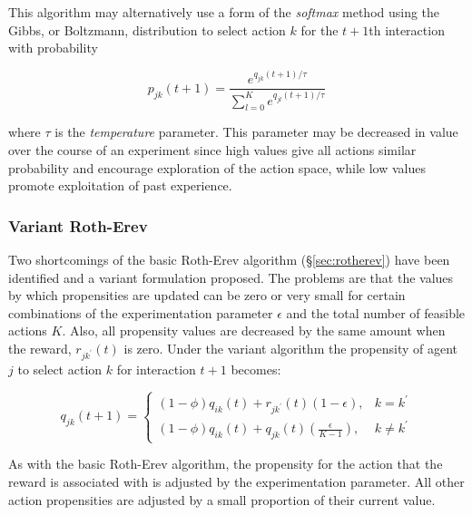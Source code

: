 This algorithm may alternatively use a form of the \textit{softmax} method
\cite{suttonbarto:1998} using the Gibbs, or Boltzmann, distribution to select
action $k$ for the $t+1$th interaction with probability

\begin{equation}
p_{jk}(t+1) = \frac{e^{q_{jk}(t+1)/\tau}}{\sum_{l=0}^K e^{q_{jl}(t+1)/\tau}}
\end{equation}

where $\tau$ is the \textit{temperature} parameter.  This parameter may be
decreased in value over the course of an experiment since high values give all
actions similar probability and encourage exploration of the action space,
while low values promote exploitation of past experience.

\subsubsection{Variant Roth-Erev}
\label{sec:variant}
Two shortcomings of the basic Roth-Erev algorithm (\S\ref{sec:rotherev}) have
been identified and a variant formulation proposed\cite{nicolaisen:2001}. The
problems are that the values by which propensities are updated can be zero or
very small for certain combinations of the experimentation parameter
$\epsilon$ and the total number of feasible actions $K$.  Also, all
propensity values are decreased by the same amount when the reward,
$r_{jk^\prime}(t)$ is zero.  Under the variant algorithm the propensity of
agent $j$ to select action $k$ for interaction $t+1$ becomes:

\begin{equation}
q_{jk}(t+1) =
\begin{cases}
(1-\phi)q_{ik}(t) + r_{jk^\prime}(t)(1-\epsilon), & \text{$k = k^\prime$} \\
(1-\phi)q_{ik}(t) + q_{jk}(t)(\frac{\epsilon}{K-1}), & \text{$k \ne
k^\prime$}
\end{cases}
\end{equation}

As with the basic Roth-Erev algorithm, the propensity for the action that the
reward is associated with is adjusted by the experimentation parameter.  All
other action propensities are adjusted by a small proportion of their current
value.

